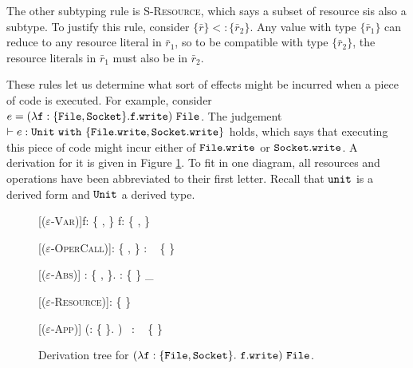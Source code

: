 The other subtyping rule is \textsc{S-Resource}, which says a subset of resource sis also a subtype. To justify this rule, consider $\{ \bar r \} <: \{ \bar r_2 \}$. Any value with type $\{ \bar r_1 \}$ can reduce to any resource literal in $\bar r_1$, so to be compatible with type $\{ \bar r_2 \}$, the resource literals in $\bar r_1$ must also be in $\bar r_2$.

These rules let us determine what sort of effects might be incurred when a piece of code is executed. For example, consider $e = \mathtt{(\lambda f: \{ File, Socket \}. f.write)~File}$. The judgement $\vdash e: \mathtt{Unit}~\mathtt{with}~ \{ \mathtt{File.write, Socket.write} \}$ holds, which says that executing this piece of code might incur either of $\mathtt{File.write}$ or $\mathtt{Socket.write}$. A derivation for it is given in Figure \ref{fig:opercalc_tree}. To fit in one diagram, all resources and operations have been abbreviated to their first letter. Recall that $\mathtt{unit}$ is a derived form and $\mathtt{Unit}$ a derived type.

\begin{figure}[h]


    \begin{prooftree*}

    		[\textsc{($\varepsilon$-Var)}]{f: \{ ,  \} \vdash f: \{ ,  \}}
    		
    		[\textsc{($\varepsilon$-OperCall)}]{: \{ ,  \} \vdash {} : \Unit~ \{  \} }
    		
    		[\textsc{($\varepsilon$-Abs)}]{ \lambda {}: \{ ,  \}.  : \{  \} \rightarrow_{} \Unit~ \varnothing }
    		
    
       [\textsc{($\varepsilon$-Resource)}]{\vdash {}: \{  \}~ \varnothing}
    
    		[\textsc{($\varepsilon$-App)}]{ \vdash (\lambda {}: \{  \}. )~ : \Unit~ \{  \}  }
    		
 	\end{prooftree*}
 	
\vspace{-12pt}
\caption{Derivation tree for $(\lambda \mathtt{f}: \{ \mathtt{File}, \mathtt{Socket} \}.~\mathtt{f.write})~\mathtt{File}$.}
\label{fig:opercalc_tree}
\end{figure}

